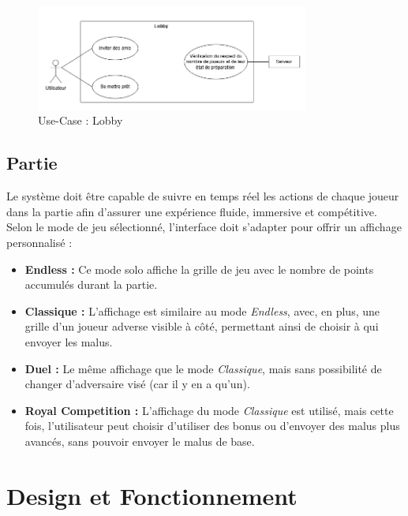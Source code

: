 \documentclass{report}
\begin{document}
\vspace{-1em}

\begin{figure}[H]
    \centering
     \includegraphics[width=0.8\textwidth, keepaspectratio]{src/sys_req/lobby.png}
    \caption{Use-Case : Lobby}
    \label{fig:use_case_lobby_sys_req}
\end{figure}

\section{Partie}

\noindent Le système doit être capable de suivre en temps réel les actions de chaque joueur dans la partie afin d'assurer une expérience fluide, immersive et compétitive. Selon le mode de jeu sélectionné, l'interface doit s'adapter pour offrir un affichage personnalisé :

\begin{itemize}
    \item \textbf{Endless :} Ce mode solo affiche la grille de jeu avec le nombre de points accumulés durant la partie.
    \item \textbf{Classique :} L'affichage est similaire au mode \emph{Endless}, avec, en plus, une grille d'un joueur adverse visible à côté, permettant ainsi de choisir à qui envoyer les malus.
    \item \textbf{Duel :} Le même affichage que le mode \emph{Classique}, mais sans possibilité de changer d'adversaire visé (car il y en a qu'un).
    \item \textbf{Royal Competition :} L'affichage du mode \emph{Classique} est utilisé, mais cette fois, l'utilisateur peut choisir d'utiliser des bonus ou d'envoyer des malus plus avancés, sans pouvoir envoyer le malus de base.
\end{itemize}




\chapter{Design et Fonctionnement}
\label{chap:design}
\end{document}

